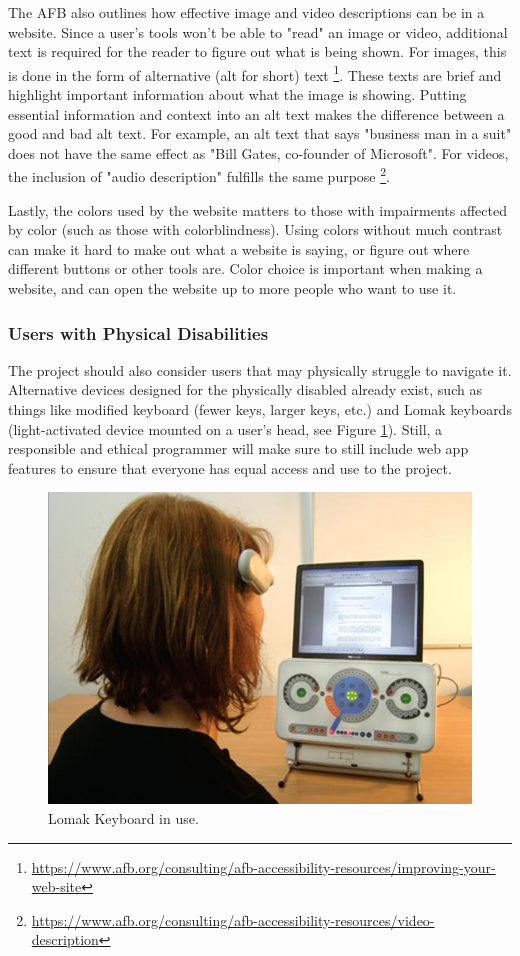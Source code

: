 \documentclass[10pt,twocolumn]{article}
\begin{document}
The AFB also outlines how effective image and video descriptions can be in a website.
Since a user's tools won't be able to "read" an image or video, additional text is required for the reader to figure out what is being shown.
For images, this is done in the form of alternative (alt for short) text \footnote{\url{https://www.afb.org/consulting/afb-accessibility-resources/improving-your-web-site}}.
These texts are brief and highlight important information about what the image is showing.
Putting essential information and context into an alt text makes the difference between a good and bad alt text.
For example, an alt text that says "business man in a suit" does not have the same effect as "Bill Gates, co-founder of Microsoft".
For videos, the inclusion of "audio description" fulfills the same purpose \footnote{\url{https://www.afb.org/consulting/afb-accessibility-resources/video-description}}.

Lastly, the colors used by the website matters to those with impairments affected by color (such as those with colorblindness).
Using colors without much contrast can make it hard to make out what a website is saying, or figure out where different buttons or other tools are.
Color choice is important when making a website, and can open the website up to more people who want to use it.

\subsubsection{Users with Physical Disabilities}

The project should also consider users that may physically struggle to navigate it.
Alternative devices designed for the physically disabled already exist, such as things like modified keyboard (fewer keys, larger keys, etc.) and Lomak keyboards (light-activated device mounted on a user's head, see Figure \ref{fig:LomakKeyboard}).
Still, a responsible and ethical programmer will make sure to still include web app features to ensure that everyone has equal access and use to the project.

\begin{figure}[ht!]
    \centering
    \includegraphics[width=.95\linewidth]{LomakKeyboard.jpg}
    \caption{
        Lomak Keyboard in use.
    }
    \label{fig:LomakKeyboard}
\end{figure}
\end{document}
